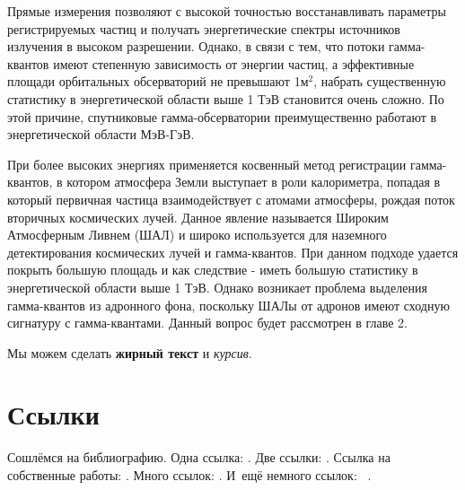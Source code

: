Прямые измерения позволяют с высокой точностью восстанавливать параметры регистрируемых частиц и получать энергетические спектры источников излучения в высоком разрешении. Однако, в связи с тем, что потоки гамма-квантов имеют степенную зависимость от энергии частиц, а эффективные площади орбитальных обсерваторий не превышают 1$м^2$, набрать существенную статистику в энергетической области выше 1 ТэВ становится очень сложно. По этой причине, спутниковые гамма-обсерватории преимущественно работают в энергетической области МэВ-ГэВ. 

При более высоких энергиях применяется косвенный метод регистрации гамма-квантов, в котором атмосфера Земли выступает в роли калориметра, попадая в который первичная частица взаимодействует с атомами атмосферы, рождая поток вторичных космических лучей. Данное явление называется Широким Атмосферным Ливнем (ШАЛ) и широко используется для наземного детектирования космических лучей и гамма-квантов. При данном подходе удается покрыть большую площадь и как следствие - иметь большую статистику в энергетической области выше 1 ТэВ. Однако возникает проблема выделения гамма-квантов из адронного фона, поскольку ШАЛы от адронов имеют сходную сигнатуру с гамма-квантами. Данный вопрос будет рассмотрен в главе 2. 



Мы можем сделать \textbf{жирный текст} и \textit{курсив}.

\section{Ссылки}\label{sec:ch1/sec2}

Сошлёмся на библиографию.
Одна ссылка: \cite[с.~54]{Sokolov}\cite[с.~36]{Gaidaenko}.
Две ссылки: \cite{Sokolov,Gaidaenko}.
Ссылка на собственные работы: \cite{vakbib1, confbib2}.
Много ссылок: %
\cite{Lermontov, Management, Borozda, Marketing, Constitution, FamilyCode,
    Gost.7.0.53, Razumovski, Lagkueva, Pokrovski, Methodology, Berestova,
    Kriger}%
%
.
И~ещё немного ссылок:~\cite{Article,Book,Booklet,Conference,Inbook,Incollection,Manual,Mastersthesis,
    Misc,Phdthesis,Proceedings,Techreport,Unpublished}
\cite{medvedev2006jelektronnye, CEAT:CEAT581, doi:10.1080/01932691.2010.513279,
    Gosele1999161,Li2007StressAnalysis, Shoji199895, test:eisner-sample,
    test:eisner-sample-shorted, AB_patent_Pomerantz_1968, iofis_patent1960}%
%
.

